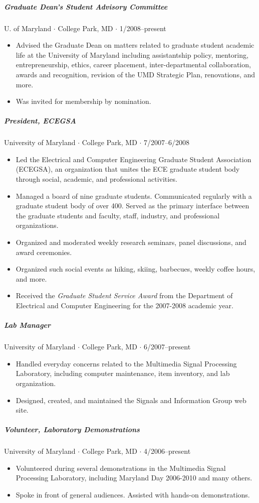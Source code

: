 \documentclass[10pt,letterpaper]{article}
\begin{document}
\subparagraph{Graduate Dean's Student Advisory Committee}
U. of Maryland $\cdot$ College Park, MD $\cdot$ 1/2008--present
\begin{itemize}
\item Advised the Graduate Dean on matters related to graduate student academic life at the University of Maryland including assistantship policy, mentoring, entrepreneurship, ethics, career placement, inter-departmental collaboration, awards and recognition, revision of the UMD Strategic Plan, renovations, and more. 
\item Was invited for membership by nomination.
\end{itemize}

\subparagraph{President, ECEGSA}
University of Maryland $\cdot$ College Park, MD $\cdot$ 7/2007--6/2008
\begin{itemize}
\item Led the Electrical and Computer Engineering Graduate Student Association (ECEGSA), an organization that unites the ECE graduate student body through social, academic, and professional activities.
\item Managed a board of nine graduate students. Communicated regularly with a graduate student body of over 400. Served as the primary interface between the graduate students and faculty, staff, industry, and professional organizations.
\item Organized and moderated weekly research seminars, panel discussions, and award ceremonies.
\item Organized such social events as hiking, skiing, barbecues, weekly coffee hours, and more.
\item Received the \textit{Graduate Student Service Award} from the Department of Electrical and Computer Engineering for the 2007-2008 academic year.
\end{itemize}

\subparagraph{Lab Manager}
University of Maryland $\cdot$ College Park, MD $\cdot$ 6/2007--present
\begin{itemize}
	\item Handled everyday concerns related to the Multimedia Signal Processing Laboratory, including computer maintenance, item inventory, and lab organization.
	\item Designed, created, and maintained the Signals and Information Group web site.
\end{itemize}


\subparagraph{Volunteer, Laboratory Demonstrations}
University of Maryland $\cdot$ College Park, MD $\cdot$ 4/2006--present
\begin{itemize}
    \item Volunteered during several demonstrations in the Multimedia Signal Processing Laboratory, including Maryland Day 2006-2010 and many others.
    \item Spoke in front of general audiences. Assisted with hands-on demonstrations.
\end{itemize}
\end{document}
